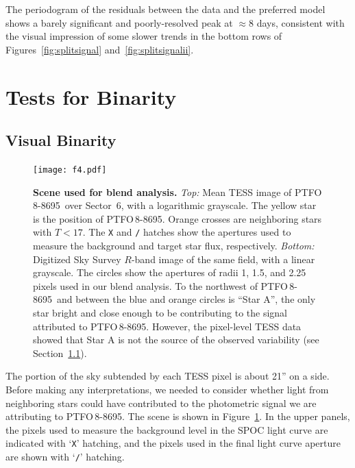 \documentclass[12pt,twocolumn,tighten]{aastex62}
\newcommand{\ptfo}{PTFO$\,$8-8695}
\begin{document}
The periodogram of the residuals between the data and the preferred
model shows a barely significant and poorly-resolved peak at
$\approx$8 days, consistent with the visual impression of some slower
trends in the bottom rows of Figures~\ref{fig:splitsignal}
and~\ref{fig:splitsignalii}.

\section{Tests for Binarity}
\label{sec:gaia}

\subsection{Visual Binarity}
\label{subsec:blend}

\begin{figure}[t]
	\begin{center}
		\leavevmode
		\texttt{[image: f4.pdf]}
	\end{center}
	\vspace{-0.7cm}
	\caption{ {\bf Scene used for blend analysis.}
    {\it Top:} Mean TESS image of \ptfo\ over Sector~6, with a
    logarithmic grayscale. The yellow star is the position of \ptfo.
    Orange crosses are neighboring stars with $T<17$. The \texttt{X}
    and \texttt{/} hatches show the apertures used to measure the
    background and target star flux, respectively.  {\it Bottom:}
    Digitized Sky Survey $R$-band image of the same field, with a
    linear grayscale. The circles show the apertures of radii 1, 1.5,
    and 2.25 pixels used in our blend analysis. To the northwest of
    \ptfo\ and between the blue and orange circles is ``Star A'', the
    only star bright and close enough to be contributing to the signal
    attributed to \ptfo. However, the pixel-level TESS data showed
    that Star A is not the source of the observed variability (see
    Section~\ref{subsec:blend}).
		\label{fig:scene}
	}
\end{figure}

The portion of the sky subtended by each TESS pixel is about 21'' on a
side. Before making any interpretations, we needed to consider whether
light from neighboring stars could have contributed to the photometric
signal we are attributing to \ptfo. The scene is shown in
Figure~\ref{fig:scene}.  In the upper panels, the pixels used to
measure the background level in the SPOC light curve are indicated
with `\texttt{X}' hatching, and the pixels used in the final light
curve aperture are shown with `\texttt{/}' hatching.
\end{document}
